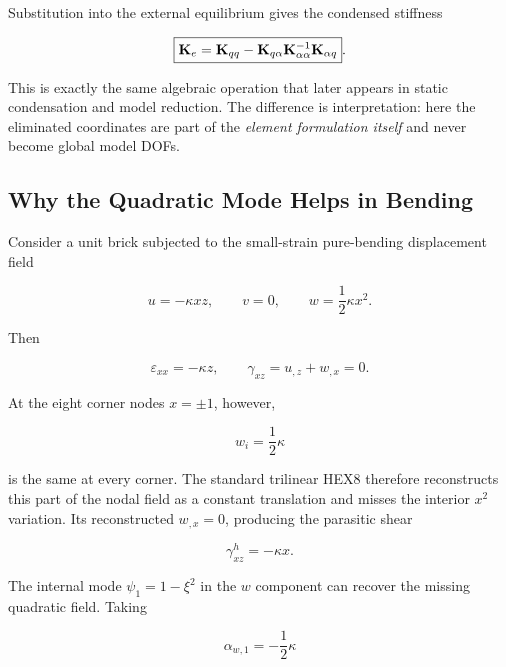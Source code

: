 Substitution into the external equilibrium gives the condensed stiffness

\begin{equation}\label{eq:enriched-condensed-stiffness}
    \boxed{
    \mathbf{K}_{e}
    =\mathbf{K}_{qq}
    -\mathbf{K}_{q\alpha}
     \mathbf{K}_{\alpha\alpha}^{-1}
     \mathbf{K}_{\alpha q}
    }.
\end{equation}

This is exactly the same algebraic operation that later appears in static
condensation and model reduction. The difference is interpretation: here the
eliminated coordinates are part of the \textit{element formulation itself} and
never become global model DOFs.

\subsection{Why the Quadratic Mode Helps in Bending}

Consider a unit brick subjected to the small-strain pure-bending displacement
field

\begin{equation}\label{eq:hex-pure-bending-field}
    u=-\kappa xz,
    \qquad
    v=0,
    \qquad
    w=\frac{1}{2}\kappa x^2.
\end{equation}

Then

\begin{equation}
    \varepsilon_{xx}=-\kappa z,
    \qquad
    \gamma_{xz}=u_{,z}+w_{,x}=0.
\end{equation}

At the eight corner nodes $x=\pm1$, however,

\begin{equation}
    w_i=\frac{1}{2}\kappa
\end{equation}

is the same at every corner. The standard trilinear HEX8 therefore reconstructs
this part of the nodal field as a constant translation and misses the interior
$x^2$ variation. Its reconstructed $w_{,x}=0$, producing the parasitic shear

\begin{equation}
    \gamma_{xz}^h=-\kappa x.
\end{equation}

The internal mode $\psi_1=1-\xi^2$ in the $w$ component can recover the missing
quadratic field. Taking

\begin{equation}
    \alpha_{w,1}=-\frac{1}{2}\kappa
\end{equation}

